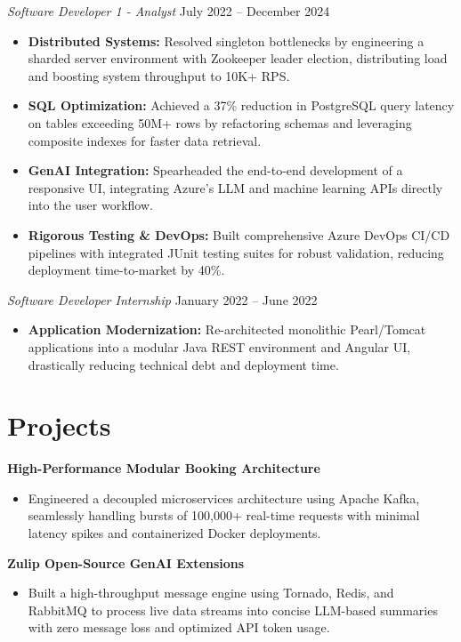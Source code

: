 \documentclass[11pt,a4paper]{article}
\begin{document}
\vspace{3pt}
\noindent
\textit{Software Developer 1 - Analyst} \hfill July 2022 -- December 2024
\begin{itemize}[leftmargin=*,noitemsep,topsep=0pt]
    \item \textbf{Distributed Systems:} Resolved singleton bottlenecks by engineering a sharded server environment with Zookeeper leader election, distributing load and boosting system throughput to 10K+ RPS.
    \item \textbf{SQL Optimization:} Achieved a 37\% reduction in PostgreSQL query latency on tables exceeding 50M+ rows by refactoring schemas and leveraging composite indexes for faster data retrieval.
    \item \textbf{GenAI Integration:} Spearheaded the end-to-end development of a responsive UI, integrating Azure's LLM and machine learning APIs directly into the user workflow.
    \item \textbf{Rigorous Testing \& DevOps:} Built comprehensive Azure DevOps CI/CD pipelines with integrated JUnit testing suites for robust validation, reducing deployment time-to-market by 40\%.
\end{itemize}

\vspace{3pt}
\noindent
\textit{Software Developer Internship} \hfill January 2022 -- June 2022
\begin{itemize}[leftmargin=*,noitemsep,topsep=0pt]
    \item \textbf{Application Modernization:} Re-architected monolithic Pearl/Tomcat applications into a modular Java REST environment and Angular UI, drastically reducing technical debt and deployment time.
\end{itemize}

\vspace{-5pt}
\section{Projects}
\noindent
\textbf{High-Performance Modular Booking Architecture}
\begin{itemize}[leftmargin=*,noitemsep,topsep=0pt]
    \item Engineered a decoupled microservices architecture using Apache Kafka, seamlessly handling bursts of 100,000+ real-time requests with minimal latency spikes and containerized Docker deployments.
\end{itemize}

\vspace{3pt}
\noindent
\textbf{Zulip Open-Source GenAI Extensions}
\begin{itemize}[leftmargin=*,noitemsep,topsep=0pt]
    \item Built a high-throughput message engine using Tornado, Redis, and RabbitMQ to process live data streams into concise LLM-based summaries with zero message loss and optimized API token usage.
\end{itemize}
\end{document}
